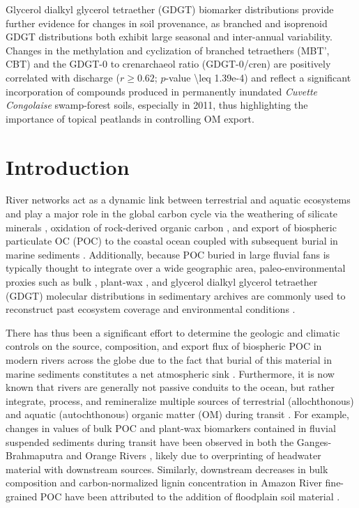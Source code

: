 Glycerol dialkyl glycerol tetraether (GDGT) biomarker distributions provide further evidence for changes in soil provenance, as branched and isoprenoid GDGT distributions both exhibit large seasonal and inter-annual variability. Changes in the methylation and cyclization of branched tetraethers (MBT', CBT) and the GDGT-0 to crenarchaeol ratio (GDGT-0/cren) are positively correlated with discharge ($r \geq 0.62$; $p$-value \num{\leq 1.39e-4}) and reflect a significant incorporation of compounds produced in permanently inundated \textit{Cuvette Congolaise} swamp-forest soils, especially in 2011, thus highlighting the importance of topical peatlands in controlling OM export.

\section{Introduction}

River networks act as a dynamic link between terrestrial and aquatic ecosystems and play a major role in the global carbon cycle via the weathering of silicate minerals \citep{Berner:1983uk,Gaillardet:1999uy}, oxidation of rock-derived organic carbon \citep[OC;][]{Galy:2008ff,Bouchez:2010if,Hilton:2014dh}, and export of biospheric particulate OC (POC) to the coastal ocean coupled with subsequent burial in marine sediments \citep{Berner:1982vg,Galy:2007ev}. Additionally, because POC buried in large fluvial fans is typically thought to integrate over a wide geographic area, paleo-environmental proxies such as bulk , plant-wax , and glycerol dialkyl glycerol tetraether (GDGT) molecular distributions in sedimentary archives are commonly used to reconstruct past ecosystem coverage and environmental conditions \citep[\textit{e.g.}][]{FranceLanord:1994vp,Freeman:2001tv,Schefuss:2005jo,Weijers:2007fp}.

There has thus been a significant effort to determine the geologic and climatic controls on the source, composition, and export flux of biospheric POC in modern rivers across the globe due to the fact that burial of this material in marine sediments constitutes a net atmospheric  sink \citep{Lasaga:1985ts,Ludwig:1996ul,Galy:2015fx}. Furthermore, it is now known that rivers are generally not passive conduits to the ocean, but rather integrate, process, and remineralize multiple sources of terrestrial (allochthonous) and aquatic (autochthonous) organic matter (OM) during transit \citep{Cole:2007gp,Aufdenkampe:2011fm}. For example, changes in  values of bulk POC and plant-wax biomarkers contained in fluvial suspended sediments during transit have been observed in both the Ganges-Brahmaputra \citep{Galy:2008jw,Galy:2011ix} and Orange Rivers \citep{Herrmann:2016eo}, likely due to overprinting of headwater material with downstream sources. Similarly, downstream decreases in bulk  composition and carbon-normalized lignin concentration in Amazon River fine-grained POC have been attributed to the addition of floodplain soil material \citep{Hedges:1986ab,Hedges:2000tn}.

